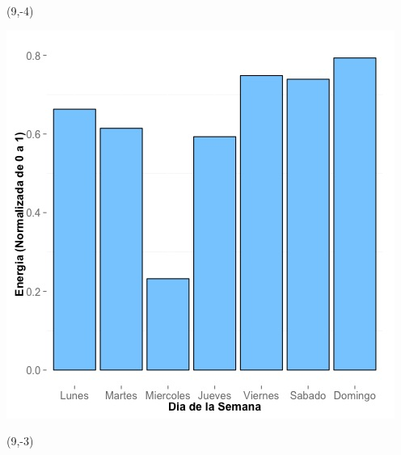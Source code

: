 \documentclass{article}\usepackage[]{graphicx}\usepackage[]{color}
\newenvironment{knitrout}{}{} %
\begin{document}
 \begin{textblock}{1}(9,-4)
\begin{minipage}{20em}
\begingroup

\endgroup
\end{minipage}
\end{textblock}


\begin{knitrout}
\color{fgcolor}
\includegraphics[scale=0.65]{figure/A12_day_of_week_plot} 
\end{knitrout}


 \begin{textblock}{1}(9,-3)
\begin{minipage}{20em}
\begingroup

\endgroup
\end{minipage}
\end{textblock}
\end{document}
